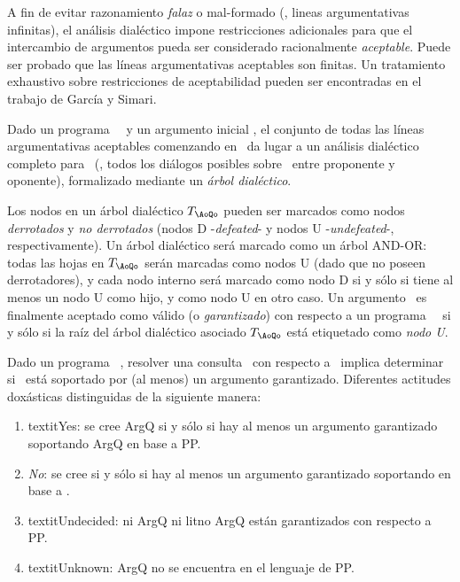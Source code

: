 A fin de evitar razonamiento \textit{falaz} o mal-formado (\eg ,
lineas argumentativas infinitas), el  análisis dialéctico impone
restricciones adicionales para que el intercambio de argumentos pueda
ser  considerado racionalmente \textit{aceptable}. Puede ser probado
que las líneas argumentativas aceptables  son finitas. Un tratamiento
exhaustivo sobre restricciones de aceptabilidad pueden ser encontradas
en el trabajo de García y Simari\cite{delp04}.

Dado un programa \DLP\ \PP\ y un argumento inicial \AoQo, el conjunto
de todas las líneas argumentativas aceptables comenzando en \AoQo\ da
lugar a un análisis dialéctico completo para \AoQo\ (\ie, todos los
diálogos posibles sobre \AoQo\ entre proponente y oponente),
formalizado mediante un \textit{árbol dialéctico}.

Los nodos en un árbol dialéctico $T_{\scriptsize \AoQo}$ pueden ser
marcados como nodos \textit{derrotados}  y \textit{no derrotados}
(nodos D -\textit{defeated}- y nodos U -\textit{undefeated}-,
respectivamente).  Un árbol dialéctico será marcado como un árbol
{\footnotesize AND-OR}: todas las hojas en  $T_{\scriptsize \AoQo}$
serán marcadas como nodos U (dado que no poseen derrotadores), y cada
nodo interno  será marcado como nodo D si y sólo si tiene al menos un
nodo U como hijo, y como nodo U en otro caso.  Un argumento \AoQo\ es
finalmente aceptado como válido (o \textit{garantizado}) con respecto
a un programa  \DLP\ \PP\  si y sólo si la raíz del árbol dialéctico
asociado $T_{\scriptsize \AoQo}$ está etiquetado como \textit{nodo U}.

Dado un programa \DLP\ \PP, resolver una consulta \ArgQ\ con respecto
a \PP\ implica determinar si \ArgQ\ está soportado por (al menos) un
argumento garantizado. Diferentes actitudes doxásticas %
distinguidas de la siguiente manera:

\begin{enumerate}[(1)]

\item textit{Yes}: se cree ArgQ si y sólo si hay al menos un argumento
garantizado soportando ArgQ en base a PP.

\item \textit{No}: se cree \lit{\no \ArgQ} si y sólo si hay al menos
un argumento garantizado  soportando \lit{\no \ArgQ} en base a \PP.

\item textit{Undecided}: ni ArgQ ni lit{no ArgQ} están garantizados
con respecto a PP.

\item textit{Unknown}: ArgQ no se encuentra en el lenguaje de PP.

\end{enumerate}
